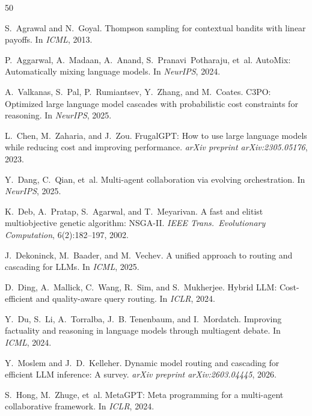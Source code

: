 \documentclass{article}
\begin{document}
\begin{thebibliography}{50}

S.~Agrawal and N.~Goyal.
\newblock Thompson sampling for contextual bandits with linear payoffs.
\newblock In \emph{ICML}, 2013.

P.~Aggarwal, A.~Madaan, A.~Anand, S.~Pranavi~Potharaju, et~al.
\newblock Auto{M}ix: Automatically mixing language models.
\newblock In \emph{NeurIPS}, 2024.

A.~Valkanas, S.~Pal, P.~Rumiantsev, Y.~Zhang, and M.~Coates.
\newblock C3{PO}: Optimized large language model cascades with probabilistic cost constraints for reasoning.
\newblock In \emph{NeurIPS}, 2025.

L.~Chen, M.~Zaharia, and J.~Zou.
\newblock Frugal{GPT}: How to use large language models while reducing cost and improving performance.
\newblock \emph{arXiv preprint arXiv:2305.05176}, 2023.

Y.~Dang, C.~Qian, et~al.
\newblock Multi-agent collaboration via evolving orchestration.
\newblock In \emph{NeurIPS}, 2025.

K.~Deb, A.~Pratap, S.~Agarwal, and T.~Meyarivan.
\newblock A fast and elitist multiobjective genetic algorithm: {NSGA-II}.
\newblock \emph{IEEE Trans.\ Evolutionary Computation}, 6(2):182--197, 2002.

J.~Dekoninck, M.~Baader, and M.~Vechev.
\newblock A unified approach to routing and cascading for {LLMs}.
\newblock In \emph{ICML}, 2025.

D.~Ding, A.~Mallick, C.~Wang, R.~Sim, and S.~Mukherjee.
\newblock Hybrid {LLM}: Cost-efficient and quality-aware query routing.
\newblock In \emph{ICLR}, 2024.

Y.~Du, S.~Li, A.~Torralba, J.~B. Tenenbaum, and I.~Mordatch.
\newblock Improving factuality and reasoning in language models through multiagent debate.
\newblock In \emph{ICML}, 2024.

Y.~Moslem and J.~D.~Kelleher.
\newblock Dynamic model routing and cascading for efficient {LLM} inference: A survey.
\newblock \emph{arXiv preprint arXiv:2603.04445}, 2026.

S.~Hong, M.~Zhuge, et~al.
\newblock Meta{GPT}: Meta programming for a multi-agent collaborative framework.
\newblock In \emph{ICLR}, 2024.


\end{thebibliography}
\end{document}
